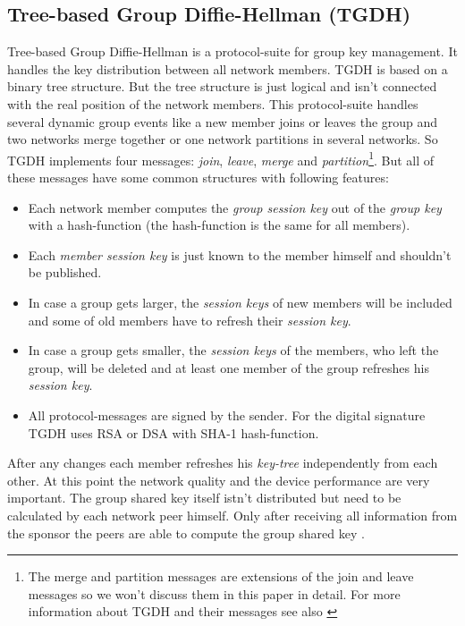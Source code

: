\subsection{Tree-based Group Diffie-Hellman (TGDH)}\label{sec:TGDH}
Tree-based Group Diffie-Hellman is a protocol-suite for group key management. It handles the key distribution between all network members. TGDH is based on a binary tree structure. But the tree structure is just logical and isn't connected with the real position of the network members. This protocol-suite handles several dynamic group events like a new member joins or leaves the group and two networks merge together or one network partitions in several networks. So TGDH implements four messages: \textsl{join}, \textsl{leave}, \textsl{merge} and \textsl{partition}\footnote{The merge and partition messages are extensions of the join and leave messages so we won't discuss them in this paper in detail. For more information about TGDH and their messages see also \cite{Liao2004}}. But all of these messages have some common structures with following features:
\begin{itemize}
  \item Each network member computes the \textsl{group session key} out of the \textsl{group key} with a hash-function (the hash-function is the same for all members).
  \item Each \textsl{member session key} is just known to the member himself and shouldn't be published.
  \item In case a group gets larger, the \textsl{session keys} of new members will be included and some of old members have to refresh their \textsl{session key}.
  \item In case a group gets smaller, the \textsl{session keys} of the members, who left the group, will be deleted and at least one member of the group refreshes his \textsl{session key}.
  \item All protocol-messages are signed by the sender. For the digital signature TGDH uses RSA or DSA with SHA-1 hash-function. 
\end{itemize}
After any changes each member refreshes his \textsl{key-tree} independently from each other. At this point the network quality and the device performance are very important. The group shared key itself istn't distributed but need to be calculated by each network peer himself. Only after receiving all information from the sponsor the peers are able to compute the group shared key \cite{Liao2004}.\\

